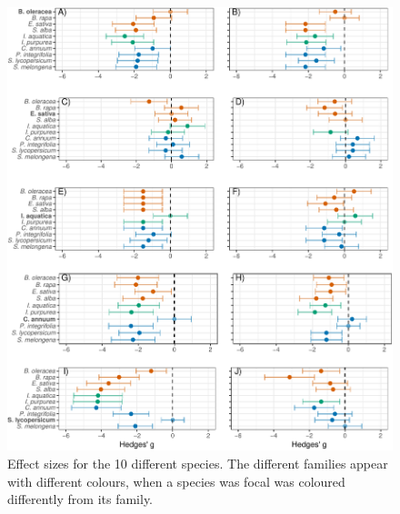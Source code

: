 \documentclass[11pt,a4paper]{article}
\begin{document}
\begin{figure}
\centering
\includegraphics{output/figures/unnamed-chunk-5-1.pdf}
\caption{Effect sizes for the 10 different species. The different
families appear with different colours, when a species was focal was
coloured differently from its family.}
\end{figure}

\newpage
\end{document}
